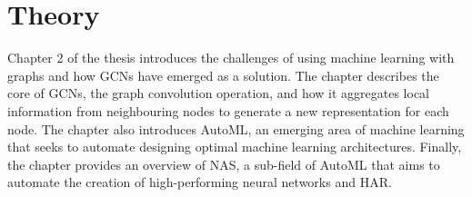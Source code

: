 \chapter{Theory}

Chapter 2 of the thesis introduces the challenges of using machine learning with graphs and how \glspl{GCN} have emerged as a solution. The chapter describes the core of \glspl{GCN}, the graph convolution operation, and how it aggregates local information from neighbouring nodes to generate a new representation for each node. The chapter also introduces \Gls{AutoML}, an emerging area of machine learning that seeks to automate designing optimal machine learning architectures. Finally, the chapter provides an overview of \gls{NAS}, a sub-field of \gls{AutoML} that aims to automate the creation of high-performing neural networks and \gls{HAR}. 





 

